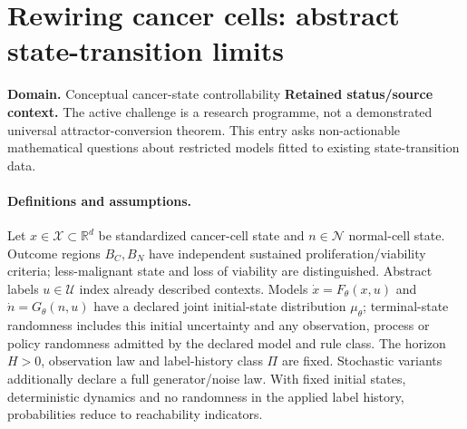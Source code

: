 \documentclass[11pt]{article}
\begin{document}
\section*{Rewiring cancer cells: abstract state-transition limits}
\label{prob:245}
\label{rank:104}
\par\smallskip

\noindent\textbf{Domain.} Conceptual cancer-state controllability \quad \textbf{Retained status/source context.} The active challenge is a research programme, not a demonstrated universal attractor-conversion theorem. This entry asks non-actionable mathematical questions about restricted models fitted to existing state-transition data.
\paragraph{Definitions and assumptions.} Let $x\in\mathcal X\subset\mathbb{R}^d$ be standardized cancer-cell state and $n\in\mathcal N$ normal-cell state. Outcome regions $B_C,B_N$ have independent sustained proliferation/viability criteria; less-malignant state and loss of viability are distinguished. Abstract labels $u\in\mathcal U$ index already described contexts. Models $\dot x=F_\theta(x,u)$ and $\dot n=G_\theta(n,u)$ have a declared joint initial-state distribution $\mu_\theta$; terminal-state randomness includes this initial uncertainty and any observation, process or policy randomness admitted by the declared model and rule class. The horizon $H>0$, observation law and label-history class $\Pi$ are fixed. Stochastic variants additionally declare a full generator/noise law. With fixed initial states, deterministic dynamics and no randomness in the applied label history, probabilities reduce to reachability indicators.
\end{document}
